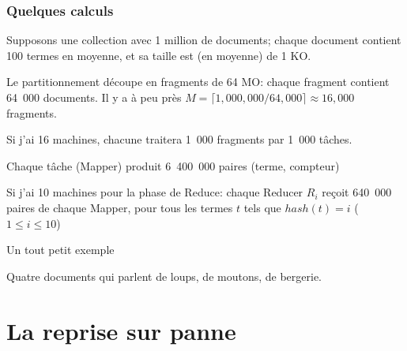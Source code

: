 \begin{frame}
\frametitle{Quelques calculs}

Supposons une collection avec 1 million de documents; chaque document contient 100 termes
en moyenne, et sa taille est (en moyenne) de 1 KO.

\vfill

Le partitionnement découpe en fragments de 64 MO: chaque fragment 
contient  64\ 000 documents. Il y a à peu près $M= \lceil 1{,}000{,}000/64{,}000
\rceil \approx 16{,}000$ fragments.

\vfill

Si j'ai 16 machines, chacune traitera 1\ 000 fragments par 1\ 000 tâches.

\vfill

Chaque tâche (Mapper) produit 6\, 400\ 000 paires (terme, compteur)

\vfill

Si j'ai 10 machines pour la phase de Reduce: chaque Reducer $R_i$ reçoit 640\ 000 paires
de chaque Mapper, pour tous les termes $t$ tels que  $\mathit{hash}(t)=i$ ($1\leq i\leq {10}$)

\end{frame}



\begin{frame}{Un tout petit exemple}

Quatre documents qui parlent de loups, de moutons, de bergerie.
\vfill



\end{frame}


\section{La reprise sur panne}


